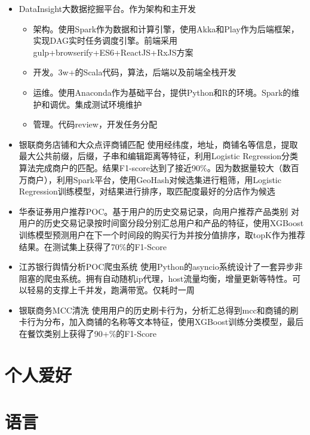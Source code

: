 \documentclass[11pt,a4paper,sans]{moderncv}        %
\begin{document}
 {
\begin{itemize}
	\item DataInsight大数据挖掘平台。作为架构和主开发
		\begin{itemize}
			\item 架构。使用Spark作为数据和计算引擎，使用Akka和Play作为后端框架，实现DAG实时任务调度引擎。前端采用gulp+browserify+ES6+ReactJS+RxJS方案
			\item 开发。3w+的Scala代码，算法，后端以及前端全栈开发
			\item 运维。使用Anaconda作为基础平台，提供Python和R的环境。Spark的维护和调优。集成测试环境维护
			\item 管理。代码review，开发任务分配
		\end{itemize}
	\item 银联商务店铺和大众点评商铺匹配
	\newline{}
	使用经纬度，地址，商铺名等信息，提取最大公共前缀，后缀，子串和编辑距离等特征，利用Logistic Regression分类算法完成商户的匹配。结果F1-score达到了接近90\%。因为数据量较大（数百万商户），利用Spark平台，使用GeoHash对候选集进行粗筛，用Logistic Regression训练模型，对结果进行排序，取匹配度最好的分店作为候选
	\item 华泰证券用户推荐POC。基于用户的历史交易记录，向用户推荐产品类别
	\newline{}
	对用户的历史交易记录按时间窗分段分别汇总用户和产品的特征，使用XGBoost训练模型预测用户在下一个时间段的购买行为并按分值排序，取topK作为推荐结果。在测试集上获得了70\%的F1-Score
	\item 江苏银行舆情分析POC爬虫系统
	\newline{}
	使用Python的asyncio系统设计了一套异步非阻塞的爬虫系统。拥有自动随机ip代理，host流量均衡，增量更新等特性。可以轻易的支撑上千并发，跑满带宽。仅耗时一周
	\item 银联商务MCC清洗
	\newline{}
	使用用户的历史刷卡行为，分析汇总得到mcc和商铺的刷卡行为分布，加入商铺的名称等文本特征，使用XGBoost训练分类模型，最后在餐饮类别上获得了90+\%的F1-Score
\end{itemize}
}

	
\section{个人爱好}

\section{语言}

\clearpage
\end{document}

